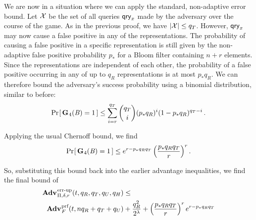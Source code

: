 We are now in a situation where we can apply the standard, non-adaptive error bound. Let $\mathcal{X}$ be the set of all queries $\mathsf{qry}_x$ made by the adversary over the course of the game. As in the previous proof, we have $|\mathcal{X}| \le q_T$. However, $\mathsf{qry}_x$ may now cause a false positive in any of the representations. The probability of causing a false positive in a specific representation is still given by the non-adaptive false positive probability $p_*$ for a Bloom filter containing $n+r$ elements. Since the representations are independent of each other, the probability of a false positive occurring in any of up to $q_R$ representations is at most $p_*q_R$. We can therefore bound the adversary's success probability using a binomial distribution, similar to before:
\begin{equation}
   \Pr\hspace{-1pt}\left[\,\textup{\textbf{G}}\hspace{0.5pt}_4(\mathit{B})=1\,\right] \le
     \sum_{i=r}^{q_T} \binom{q_T}{i}(p_*q_R)^i(1-p_*q_R)^{q_T-i} \,.
\end{equation}

Applying the usual Chernoff bound, we find
\begin{equation}
   \Pr\hspace{-1pt}\left[\,\textup{\textbf{G}}\hspace{0.5pt}_4(\mathit{B})=1\,\right] \le
     e^{r-p_*q_Rq_T}\left(\frac{p_*q_Rq_T}{r}\right)^r.
\end{equation}

So, substituting this bound back into the earlier advantage inequalities, we find the final bound of
\begin{equation*}
  \begin{aligned}
    \Adv{\errep}_{\Pi,\delta,r}(t, q_R,q_T,q_U,q_H) &\leq \\
      \Adv{\prf}_F(t,nq_R+q_T+q_U) & +
    \frac{q_R^2}{2^\lambda} +
    \left(\frac{p_*q_Rq_T}{r}\right)^re^{r-p_*q_Rq_T}
  \end{aligned}
\end{equation*}